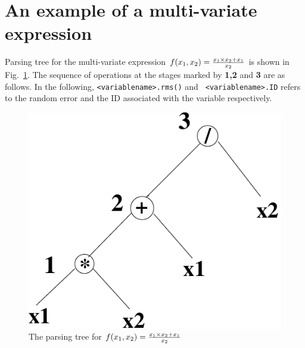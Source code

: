 \documentclass[12pt]{article}
\begin{document}
\section{An example of a multi-variate expression}
\label{APPEN:EX}
Parsing tree for the multi-variate expression $f(x_1,x_2)={x_1\times
x_2+x_1 \over {x_2}}$ is shown in Fig.~\ref{EX2}.  The sequence of
operations at the stages marked by {\bf 1,2} and {\bf 3} are as
follows.  In the following, {\tt <variablename>.rms()} and {\tt
<variablename>.ID} refers to the random error and the ID associated
with the variable respectively.
\begin{figure}[t]
\begin{center}
  \includegraphics[scale=0.45]{Figs/fig2}
\caption[]{The parsing tree for $f(x_1,x_2)={x_1\times x_2+x_1 \over {x_2}}$}
\label{EX2}
\end{center}
\end{figure}
\end{document}
